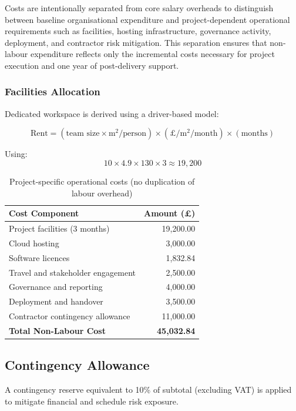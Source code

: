 \documentclass{article}
\begin{document}
Costs are intentionally separated from core salary overheads to distinguish between baseline organisational expenditure and project-dependent operational requirements such as facilities, hosting infrastructure, governance activity, deployment, and contractor risk mitigation. This separation ensures that non-labour expenditure reflects only the incremental costs necessary for project execution and one year of post-delivery support.


\subsubsection*{Facilities Allocation}

Dedicated workspace is derived using a driver-based model:

\[
\text{Rent} = (\text{team size} \times \text{m}^2/\text{person}) 
\times (\pounds/\text{m}^2/\text{month}) \times (\text{months})
\]

Using:
\[
10 \times 4.9 \times 130 \times 3 \approx 19,200
\]

\begin{table}[h]
\centering
\begin{tabular}{|l|r|}
\hline
\textbf{Cost Component} & \textbf{Amount (£)} \\
\hline
Project facilities (3 months) & 19,200.00 \\
Cloud hosting & 3,000.00 \\
Software licences & 1,832.84 \\
Travel and stakeholder engagement & 2,500.00 \\
Governance and reporting & 4,000.00 \\
Deployment and handover & 3,500.00 \\
Contractor contingency allowance & 11,000.00 \\
\hline
\textbf{Total Non-Labour Cost} & \textbf{45,032.84} \\
\hline
\end{tabular}
\caption{Project-specific operational costs (no duplication of labour overhead)}
\end{table}

\subsection{Contingency Allowance}

A contingency reserve equivalent to 10\% of subtotal (excluding VAT) 
is applied to mitigate financial and schedule risk exposure.
\end{document}
